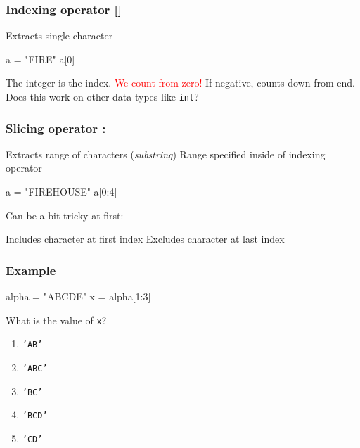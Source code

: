 \documentclass[11pt]{beamer}
\begin{document}
\begin{frame}[fragile]
  \frametitle{Indexing operator \textbf{[]}}
  \Enlarge

  \begin{itemize}
  \myitem  Extracts single character
\begin{semiverbatim}
a = "FIRE"
a[0]
\end{semiverbatim}
  \myitem  The integer is the index. \pause
  \myitem  \textcolor{red}{We count from zero!} \pause
  \myitem  If negative, counts down from end. \pause
  \myitem  Does this work on other data types like \texttt{int}?
  \end{itemize}
\end{frame}

\begin{frame}[fragile]
  \frametitle{Slicing operator \textbf{:}}
  \Enlarge

  \begin{itemize}
  \myitem  Extracts range of characters (\emph{substring}) \pause
  \myitem  Range specified inside of indexing operator \pause
\begin{semiverbatim}
a = "FIREHOUSE"
a[0:4]
\end{semiverbatim} \pause
  \myitem  Can be a bit tricky at first:
    \begin{itemize}
    \mysubitem  Includes character at first index
    \mysubitem  Excludes character at last index
    \end{itemize}
  \end{itemize}
\end{frame}

\begin{frame}[fragile]
  \frametitle{Example}
  \Enlarge

  \begin{semiverbatim}
alpha = "ABCDE"
x = alpha[1:3]
  \end{semiverbatim}
  What is the value of \texttt{x}?
  \begin{enumerate}[label=\Alph*]
  \item  \texttt{'AB'}
  \item  \texttt{'ABC'}
  \item  \texttt{'BC'}
  \item  \texttt{'BCD'}
  \item  \texttt{'CD'}
  \end{enumerate}
\end{frame}
\end{document}
